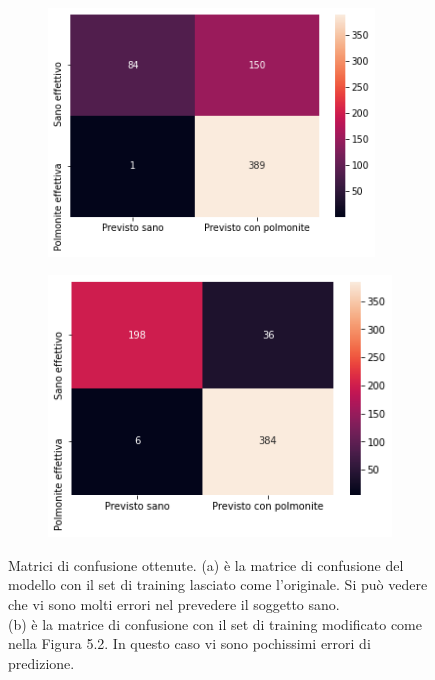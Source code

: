  \begin{figure}[H]
        \begin{subfigure}{0.5\textwidth}
          \centering
          \includegraphics[width=0.95\textwidth]{Figures/conf-matrix-no-aug.png}
          \caption{}
          \label{fig:snap1}
        \end{subfigure}%
        \begin{subfigure}{0.5\textwidth}
          \centering
          \includegraphics[width=.95\textwidth]{Figures/conf-matrix-pneumonia-aug.png}
          \caption{}
          \label{fig:snap2}
        \end{subfigure}%
        \caption{ Matrici di confusione ottenute. (a) è la matrice di confusione del modello con il set di
         training lasciato come l'originale. 
        Si può vedere che vi sono molti errori nel prevedere il soggetto sano. \\
        (b) è la matrice di confusione con il set di training modificato come nella Figura 5.2. 
        In questo caso vi sono pochissimi errori di predizione.
        }
        \label{fig:fig}
\end{figure} 


